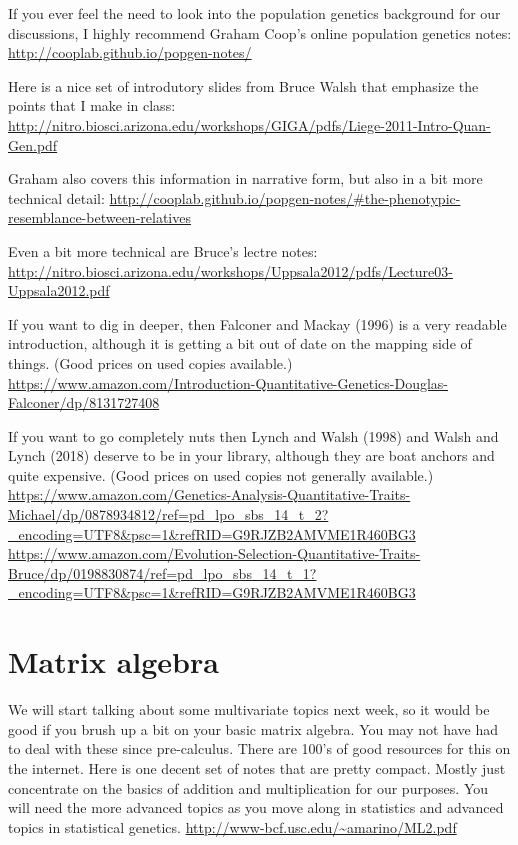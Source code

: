 \documentclass[]{book}
\begin{document}
If you ever feel the need to look into the population genetics background for our discussions, I highly recommend Graham Coop's online population genetics notes:
\url{http://cooplab.github.io/popgen-notes/}

Here is a nice set of introdutory slides from Bruce Walsh that emphasize the points that I make in class:
\url{http://nitro.biosci.arizona.edu/workshops/GIGA/pdfs/Liege-2011-Intro-Quan-Gen.pdf}

Graham also covers this information in narrative form, but also in a bit more technical detail:
\url{http://cooplab.github.io/popgen-notes/\#the-phenotypic-resemblance-between-relatives}

Even a bit more technical are Bruce's lectre notes:
\url{http://nitro.biosci.arizona.edu/workshops/Uppsala2012/pdfs/Lecture03-Uppsala2012.pdf}

If you want to dig in deeper, then Falconer and Mackay (1996) is a very readable introduction, although it is getting a bit out of date on the mapping side of things. (Good prices on used copies available.)
\url{https://www.amazon.com/Introduction-Quantitative-Genetics-Douglas-Falconer/dp/8131727408}

If you want to go completely nuts then Lynch and Walsh (1998) and Walsh and Lynch (2018) deserve to be in your library, although they are boat anchors and quite expensive. (Good prices on used copies not generally available.)
\url{https://www.amazon.com/Genetics-Analysis-Quantitative-Traits-Michael/dp/0878934812/ref=pd_lpo_sbs_14_t_2?_encoding=UTF8\&psc=1\&refRID=G9RJZB2AMVME1R460BG3}
\url{https://www.amazon.com/Evolution-Selection-Quantitative-Traits-Bruce/dp/0198830874/ref=pd_lpo_sbs_14_t_1?_encoding=UTF8\&psc=1\&refRID=G9RJZB2AMVME1R460BG3}

\hypertarget{matrix-algebra-1}{%
\section{Matrix algebra}\label{matrix-algebra-1}}

We will start talking about some multivariate topics next week, so it would be good if you brush up a bit on your basic matrix algebra. You may not have had to deal with these since pre-calculus. There are 100's of good resources for this on the internet. Here is one decent set of notes that are pretty compact. Mostly just concentrate on the basics of addition and multiplication for our purposes. You will need the more advanced topics as you move along in statistics and advanced topics in statistical genetics.
\url{http://www-bcf.usc.edu/~amarino/ML2.pdf}
\end{document}
